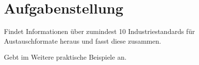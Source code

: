 
\section{Aufgabenstellung}
Findet Informationen über zumindest 10 Industriestandards für Austauschformate heraus und fasst diese zusammen.

Gebt im Weitere praktische Beispiele an.
\clearpage